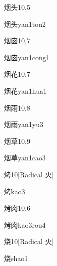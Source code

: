 \begin{entry}{烟头}{10,5}
  \begin{phonetics}{烟头}{yan1tou2}
  \end{phonetics}
\end{entry}

\begin{entry}{烟囱}{10,7}
  \begin{phonetics}{烟囱}{yan1cong1}
  \end{phonetics}
\end{entry}

\begin{entry}{烟花}{10,7}
  \begin{phonetics}{烟花}{yan1hua1}
  \end{phonetics}
\end{entry}

\begin{entry}{烟雨}{10,8}
  \begin{phonetics}{烟雨}{yan1yu3}
  \end{phonetics}
\end{entry}

\begin{entry}{烟草}{10,9}
  \begin{phonetics}{烟草}{yan1cao3}
  \end{phonetics}
\end{entry}

\begin{entry}{烤}{10}[Radical 火]
  \begin{phonetics}{烤}{kao3}
  \end{phonetics}
\end{entry}

\begin{entry}{烤肉}{10,6}
  \begin{phonetics}{烤肉}{kao3rou4}
  \end{phonetics}
\end{entry}

\begin{entry}{烧}{10}[Radical 火]
  \begin{phonetics}{烧}{shao1}
  \end{phonetics}
\end{entry}

